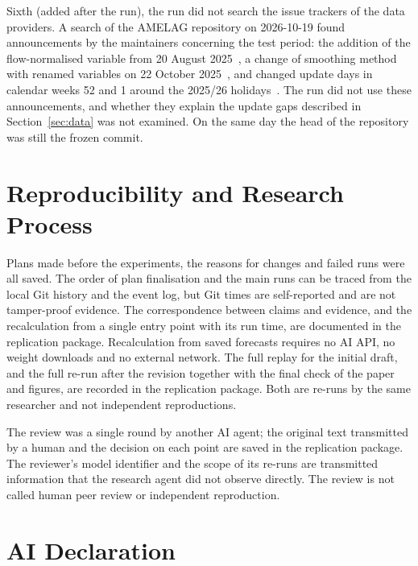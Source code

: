 \documentclass[11pt]{article}
\begin{document}
Sixth (added after the run), the run did not search the issue trackers of the data providers. A search of the AMELAG repository on 2026-10-19 found announcements by the maintainers concerning the test period: the addition of the flow-normalised variable from 20 August 2025~\cite{amelag36}, a change of smoothing method with renamed variables on 22 October 2025~\cite{amelag40}, and changed update days in calendar weeks 52 and 1 around the 2025/26 holidays~\cite{amelag45}. The run did not use these announcements, and whether they explain the update gaps described in Section~\ref{sec:data} was not examined. On the same day the head of the repository was still the frozen commit.

\section{Reproducibility and Research Process}

Plans made before the experiments, the reasons for changes and failed runs were all saved. The order of plan finalisation and the main runs can be traced from the local Git history and the event log, but Git times are self-reported and are not tamper-proof evidence. The correspondence between claims and evidence, and the recalculation from a single entry point with its run time, are documented in the replication package. Recalculation from saved forecasts requires no AI API, no weight downloads and no external network. The full replay for the initial draft, and the full re-run after the revision together with the final check of the paper and figures, are recorded in the replication package. Both are re-runs by the same researcher and not independent reproductions.

The review was a single round by another AI agent; the original text transmitted by a human and the decision on each point are saved in the replication package. The reviewer's model identifier and the scope of its re-runs are transmitted information that the research agent did not observe directly. The review is not called human peer review or independent reproduction.

\section*{AI Declaration}
\end{document}
